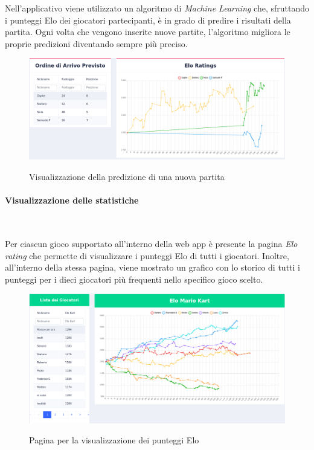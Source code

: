 		\noindent Nell'applicativo viene utilizzato un algoritmo di \emph{Machine Learning} che, sfruttando i punteggi \gls{Elo} dei giocatori partecipanti, è in grado di predire i risultati della partita.
		Ogni volta che vengono inserite nuove partite, l'algoritmo migliora le proprie predizioni diventando sempre più preciso. 
		
		\begin{figure}[H]
			\centering
			\includegraphics[width=\textwidth]{immagini/predizione.png} \\
			\caption{\label{fig:predizione} Visualizzazione della predizione di una nuova partita}
		\end{figure}
		
		\paragraph{Visualizzazione delle statistiche} ~\smallskip 
		
		\noindent Per ciascun gioco supportato all'interno della web app è presente la pagina \emph{\gls{Elo} rating}
		che permette di visualizzare i punteggi \gls{Elo} di tutti i giocatori. Inoltre, all'interno della stessa 
		pagina, viene mostrato un grafico con lo storico di tutti i punteggi per i dieci giocatori più frequenti nello specifico gioco scelto.
		
		\begin{figure}[H]
			\centering
			\includegraphics[width=\textwidth]{immagini/elo.png} \\
			\caption{\label{fig:elo} Pagina per la visualizzazione dei punteggi Elo}
		\end{figure}
		
